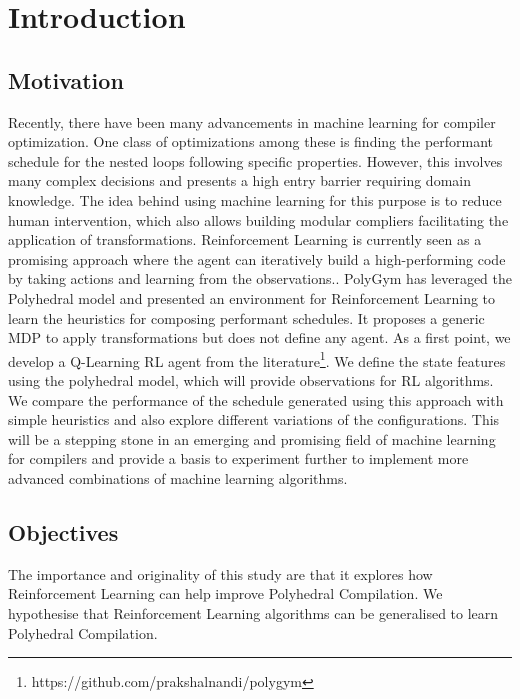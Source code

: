 \documentclass[logo,msc]{infthesis}           %
\begin{document}
\chapter{Introduction}

\section{Motivation}

Recently, there have been many advancements in machine learning for compiler optimization. One class of optimizations among these is finding the performant schedule for the nested loops following specific properties. However, this involves many complex decisions and presents a high entry barrier requiring domain knowledge. The idea behind using machine learning for this purpose is to reduce human intervention, which also allows building modular compliers facilitating the application of transformations. Reinforcement Learning is currently seen as a promising approach where the agent can iteratively build a high-performing code by taking actions and learning from the observations.\cite{8357388}\cite{9232934}. PolyGym has leveraged the Polyhedral model and presented an environment for Reinforcement Learning to learn the heuristics for composing performant schedules. It proposes a generic MDP to apply transformations but does not define any agent. \break
As a first point, we develop a Q-Learning RL agent from the literature\footnote{https://github.com/prakshalnandi/polygym}. We define the state features using the polyhedral model, which will provide observations for RL algorithms. We compare the performance of the schedule generated using this approach with simple heuristics and also explore different variations of the configurations. This will be a stepping stone in an emerging and promising field of machine learning for compilers and provide a basis to experiment further to implement more advanced combinations of machine learning algorithms.



\section{Objectives}

The importance and originality of this study are that it explores how Reinforcement Learning can help improve Polyhedral Compilation.  We hypothesise that Reinforcement Learning algorithms can be generalised to learn Polyhedral Compilation.
\end{document}
